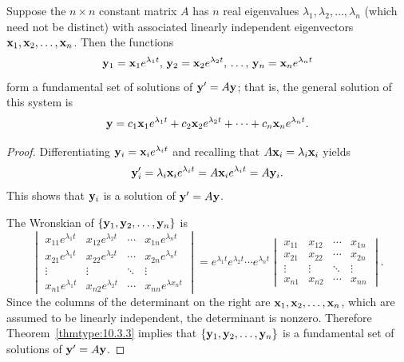 \documentclass{ximera}
\begin{document}
\begin{theorem}\label{thmtype:10.4.1}
 Suppose the $n\times n$
constant matrix $A$ has $n$ real eigenvalues
$\lambda_1,\lambda_2,\ldots,\lambda_n$
(which need not be distinct) with associated
linearly independent eigenvectors ${\bf x}_1,{\bf x}_2,\ldots,{\bf x}_n$.
Then the functions
$$
{\bf y}_1={\bf x}_1e^{\lambda_1 t},\,
 {\bf y}_2={\bf x}_2e^{\lambda_2 t},\,
\dots,\,
{\bf y}_n={\bf x}_ne^{\lambda_n t}
$$
 form a fundamental set of solutions of  ${\bf y}'=A{\bf y}$;
that is, the general solution of this system is
$$
{\bf y}=c_1{\bf x}_1e^{\lambda_1 t}+c_2{\bf x}_2e^{\lambda_2 t}
+\cdots+c_n{\bf x}_ne^{\lambda_n t}.
$$
\end{theorem}

\begin{proof}
Differentiating ${\bf y}_i={\bf x}_ie^{\lambda_it}$ and recalling
that $A{\bf x}_i=\lambda_i{\bf x}_i$ yields
$$
{\bf y}_i'=\lambda_i{\bf x}_ie^{\lambda_it}=A{\bf x}_ie^{\lambda_it}
=A{\bf y}_i.
$$
This shows that ${\bf y}_i$ is a solution of ${\bf y}'=A{\bf y}$.

The Wronskian of
 $\{{\bf y}_1,{\bf y}_2,\ldots,{\bf y}_n\}$ is
$$
\begin{vmatrix}  x_{11}e^{\lambda_1 t}& x_{12}e^{\lambda_2
t}&\cdots& x_{1n}e^{\lambda_n t}\\
 x_{21}e^{\lambda_1 t}& x_{22}e^{\lambda_2
t}&\cdots& x_{2n}e^{\lambda_n t}\\\vdots&\vdots&\ddots&\vdots\\
  x_{n1}e^{\lambda_1 t}& x_{n2}e^{\lambda_2
t}&\cdots& x_{nn}e^{\lambda x_n t}\end{vmatrix}
=e^{\lambda_1 t}e^{\lambda_2 t}\cdots e^{\lambda_n t}
\begin{vmatrix}
x_{11}&x_{12}&\cdots&x_{1n}\\
x_{21}&x_{22}&\cdots&x_{2n}\\
\vdots&\vdots&\ddots&\vdots\\
x_{n1}&x_{n2}&\cdots&x_{nn}
\end{vmatrix}.
$$
Since the columns of the determinant on the right are ${\bf x}_1, {\bf
x}_2, \dots, {\bf x}_n$, which are assumed to be linearly independent,
the determinant is nonzero. Therefore
Theorem~\ref{thmtype:10.3.3} implies that
$\{{\bf y}_1,{\bf y}_2,\ldots,{\bf y}_n\}$ is a fundamental set of
solutions of ${\bf y}'=A{\bf y}$.
\end{proof}
\end{document}

